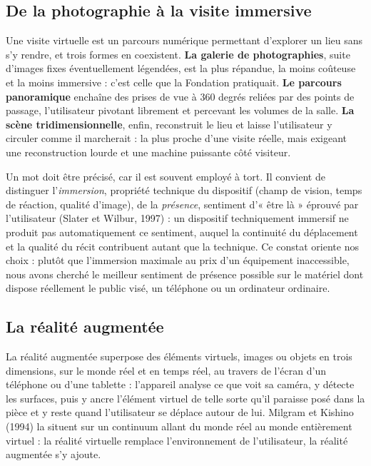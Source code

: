 \subsection{De la photographie à la visite immersive}

Une visite virtuelle est un parcours numérique permettant d'explorer un lieu
sans s'y rendre, et trois formes en coexistent. \textbf{La galerie de
photographies}, suite d'images fixes éventuellement légendées, est la plus
répandue, la moins coûteuse et la moins immersive : c'est celle que la Fondation
pratiquait. \textbf{Le parcours panoramique} enchaîne des prises de vue à
360 degrés reliées par des points de passage, l'utilisateur pivotant librement
et percevant les volumes de la salle. \textbf{La scène tridimensionnelle},
enfin, reconstruit le lieu et laisse l'utilisateur y circuler comme il
marcherait : la plus proche d'une visite réelle, mais exigeant une
reconstruction lourde et une machine puissante côté visiteur.

Un mot doit être précisé, car il est souvent employé à tort. Il convient de
distinguer l'\emph{immersion}, propriété technique du dispositif (champ de
vision, temps de réaction, qualité d'image), de la \emph{présence}, sentiment
d'« être là » éprouvé par l'utilisateur (Slater et Wilbur, 1997) : un dispositif
techniquement immersif ne produit pas automatiquement ce sentiment, auquel la
continuité du déplacement et la qualité du récit contribuent autant que la
technique. Ce constat oriente nos choix : plutôt que l'immersion maximale au
prix d'un équipement inaccessible, nous avons cherché le meilleur sentiment de
présence possible sur le matériel dont dispose réellement le public visé, un
téléphone ou un ordinateur ordinaire.

\subsection{La réalité augmentée}

La réalité augmentée superpose des éléments virtuels, images ou objets en trois
dimensions, sur le monde réel et en temps réel, au travers de l'écran d'un
téléphone ou d'une tablette : l'appareil analyse ce que voit sa caméra, y détecte
les surfaces, puis y ancre l'élément virtuel de telle sorte qu'il paraisse posé
dans la pièce et y reste quand l'utilisateur se déplace autour de lui. Milgram
et Kishino (1994) la situent sur un continuum allant du monde réel au monde
entièrement virtuel : la réalité virtuelle remplace l'environnement de
l'utilisateur, la réalité augmentée s'y ajoute.

